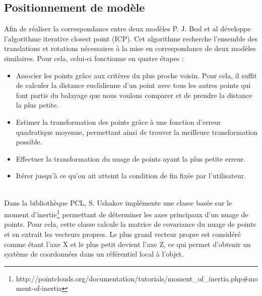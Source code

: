 \subsection{Positionnement de modèle}
Afin de réaliser la correspondance entre deux modèles P. J. Besl et al\cite{ICP} développe l'algorithme \og iterative closest point \fg (ICP).
Cet algorithme recherche l'ensemble des translations et rotations nécessaires à la mise en correspondance de deux modèles similaires. Pour cela,
celui-ci fonctionne en quatre étapes :
\begin{itemize}
  \item Associer les points grâce aux critères du plus proche voisin. Pour cela, il suffit de calculer la distance euclidienne d'un
   point avec tous les autres points qui font partis du balayage que nous voulons comparer et de prendre la distance la plus petite.
  \item Estimer la transformation des points grâce à une fonction d'erreur quadratique moyenne, permettant ainsi de trouver la meilleure
  transformation possible.
  \item Effectuer la transformation du nuage de points ayant la plus petite erreur.
  \item Itérer jusqu'à ce qu'on ait atteint la condition de fin fixée par l'utilisateur.
\end{itemize}
\ \\
Dans la bibliothèque PCL\cite{PCL}, S. Ushakov implémente une classe basée sur le moment d'inertie\footnote{http://pointclouds.org/documentation/tutorials/moment\_of\_inertia.php\#moment-of-inertia}
permettant de déterminer les axes principaux d'un nuage de points. Pour cela, cette classe calcule la matrice de covariance du nuage de points et 
en extrait les vecteurs propres. Le plus grand vecteur propre est considéré comme étant l'axe X et le plus petit devient l'axe Z, ce qui permet 
d'obtenir un système de coordonnées dans un référentiel local à l'objet.\\   
